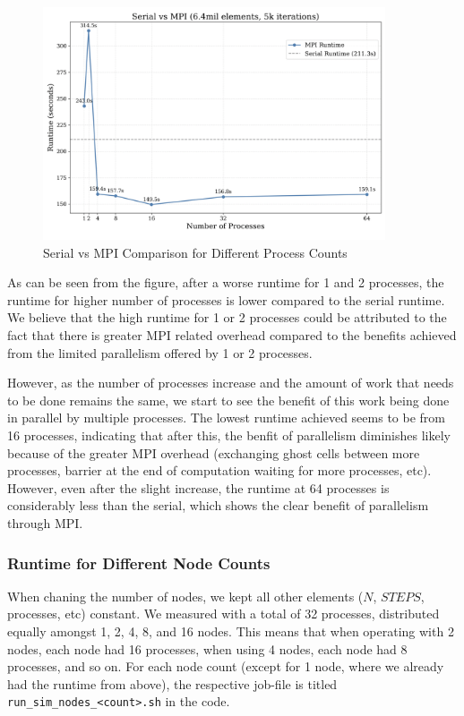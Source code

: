 \documentclass[a4paper,10pt]{article}
\begin{document}
\begin{figure}[H]
  \centering
  \includegraphics[width=0.9\textwidth]{img/ex1/serial_vs_mpi}
  \caption{Serial vs MPI Comparison for Different Process Counts}
  \label{fig:ex1_process_counts}
\end{figure}
As can be seen from the figure, after a worse runtime for 1 and 2 processes, the runtime for higher number of processes is lower compared to the serial runtime. We believe that the high runtime for 1 or 2 processes could be attributed to the fact that there is greater MPI related overhead compared to the benefits achieved from the limited parallelism offered by 1 or 2 processes.
 
However, as the number of processes increase and the amount of work that needs to be done remains the same, we start to see the benefit of this work being done in parallel by multiple processes. The lowest runtime achieved seems to be from 16 processes, indicating that after this, the benfit of parallelism diminishes likely because of the greater MPI overhead (exchanging ghost cells between more processes, barrier at the end of computation waiting for more processes, etc). However, even after the slight increase, the runtime at 64 processes is considerably less than the serial, which shows the clear benefit of parallelism through MPI. 

\subsubsection{Runtime for Different Node Counts}
When chaning the number of nodes, we kept all other elements ($N$, $STEPS$, processes, etc) constant. We measured with a total of 32 processes, distributed equally amongst 1, 2, 4, 8, and 16 nodes. This means that when operating with 2 nodes, each node had 16 processes, when using 4 nodes, each node had 8 processes, and so on. For each node count (except for 1 node, where we already had the runtime from above), the respective job-file is titled \verb|run_sim_nodes_<count>.sh| in the code. 
\end{document}
